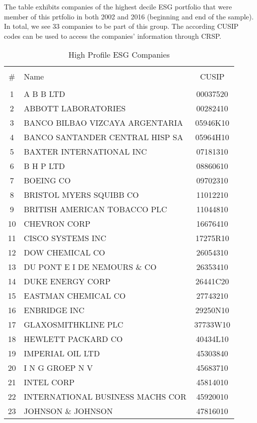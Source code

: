 \documentclass[11pt]{article}
\newcommand\fnote[1]{\captionsetup{font=small}\caption*{#1}}
\begin{document}
\begin{appendices}
\begin{table}[!htbp] \centering 
	\caption{High Profile ESG Companies} 
	\fnote{The table exhibits companies of the highest decile ESG portfolio that were member of this prtfolio in both 2002 and 2016 (beginning and end of the sample). In total, we see 33 companies to be part of this group. The according CUSIP codes can be used to access the companies' information through CRSP.}
	\label{tab:high_esg_companies} 
	\begin{tabular}{@{\extracolsep{5pt}} clc} 
		\\[-1.8ex]\hline 
		\hline \\[-1.8ex] 
		\# & Name & CUSIP \\ 
		\hline \\[-1.8ex] 
		1 & A B B LTD & 00037520 \\ 
		2 & ABBOTT LABORATORIES & 00282410 \\ 
		3 & BANCO BILBAO VIZCAYA ARGENTARIA & 05946K10 \\ 
		4 & BANCO SANTANDER CENTRAL HISP SA & 05964H10 \\ 
		5 & BAXTER INTERNATIONAL INC & 07181310 \\ 
		6 & B H P LTD & 08860610 \\ 
		7 & BOEING CO & 09702310 \\ 
		8 & BRISTOL MYERS SQUIBB CO & 11012210 \\ 
		9 & BRITISH AMERICAN TOBACCO PLC & 11044810 \\ 
		10 & CHEVRON CORP & 16676410 \\ 
		11 & CISCO SYSTEMS INC & 17275R10 \\ 
		12 & DOW CHEMICAL CO & 26054310 \\ 
		13 & DU PONT E I DE NEMOURS \& CO & 26353410 \\ 
		14 & DUKE ENERGY CORP & 26441C20 \\ 
		15 & EASTMAN CHEMICAL CO & 27743210 \\ 
		16 & ENBRIDGE INC & 29250N10 \\ 
		17 & GLAXOSMITHKLINE PLC & 37733W10 \\ 
		18 & HEWLETT PACKARD CO & 40434L10 \\ 
		19 & IMPERIAL OIL LTD & 45303840 \\ 
		20 & I N G GROEP N V & 45683710 \\ 
		21 & INTEL CORP & 45814010 \\ 
		22 & INTERNATIONAL BUSINESS MACHS COR & 45920010 \\ 
		23 & JOHNSON \& JOHNSON & 47816010 \\ 

\end{tabular}
\end{table}
\end{appendices}
\end{document}
